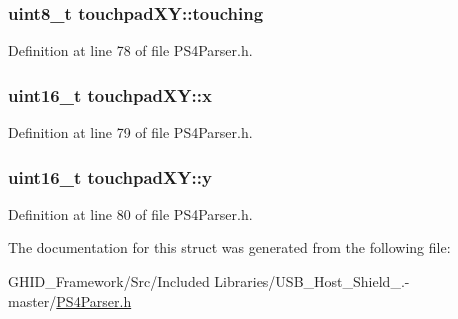 \hypertarget{structtouchpad_x_y_a2c078e99c3b96303e6b6a60e2f36acc5}{
\subsubsection[{touching}]{\setlength{\rightskip}{0pt plus 5cm}uint8\-\_\-t {\bf touchpad\-X\-Y\-::touching}}}\label{structtouchpad_x_y_a2c078e99c3b96303e6b6a60e2f36acc5}


\-Definition at line 78 of file \-P\-S4\-Parser.\-h.

\hypertarget{structtouchpad_x_y_a1c38a3e4161b1495b4d8ce37124c72a5}{
\subsubsection[{x}]{\setlength{\rightskip}{0pt plus 5cm}uint16\-\_\-t {\bf touchpad\-X\-Y\-::x}}}\label{structtouchpad_x_y_a1c38a3e4161b1495b4d8ce37124c72a5}


\-Definition at line 79 of file \-P\-S4\-Parser.\-h.

\hypertarget{structtouchpad_x_y_ac4ceb26c0ebba1c5a2691a1ecdb7dbae}{
\subsubsection[{y}]{\setlength{\rightskip}{0pt plus 5cm}uint16\-\_\-t {\bf touchpad\-X\-Y\-::y}}}\label{structtouchpad_x_y_ac4ceb26c0ebba1c5a2691a1ecdb7dbae}


\-Definition at line 80 of file \-P\-S4\-Parser.\-h.



\-The documentation for this struct was generated from the following file\-:\begin{DoxyCompactItemize}
\item 
\-G\-H\-I\-D\-\_\-\-Framework/\-Src/\-Included Libraries/\-U\-S\-B\-\_\-\-Host\-\_\-\-Shield\-\_.-\/master/\hyperlink{_p_s4_parser_8h}{\-P\-S4\-Parser.\-h}\end{DoxyCompactItemize}
